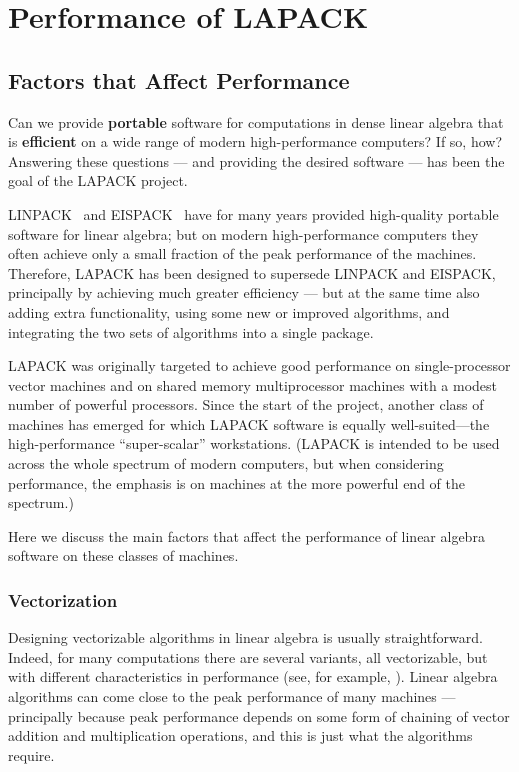 \chapter{Performance of LAPACK}\label{chapperformance}

\section{Factors that Affect Performance}\label{secperf}

Can we provide {\bf portable} software for computations
in dense linear algebra
that is {\bf efficient} on a wide range of modern high-performance
computers?
If so, how?
Answering these questions --- and providing
the desired software --- has been the goal of the LAPACK project.

LINPACK~\cite{dongarra79}
and EISPACK~\cite{Smith76,Garbow77} have for many years provided
high-quality portable software for linear algebra; but
on modern high-performance computers they often
achieve only a small fraction of the peak performance of the machines.
Therefore, LAPACK has been designed to supersede LINPACK and EISPACK,
principally by achieving much greater efficiency --- but at the same time
also adding extra functionality, using some new or improved algorithms,
and integrating the two sets of algorithms into a single package.

LAPACK was originally targeted to achieve good performance on
single-processor
vector machines and on shared memory multiprocessor
machines with a modest
number of powerful processors. Since the start of the project,
another class of machines has
emerged for which LAPACK software is equally well-suited---the
high-performance
``super-scalar'' workstations.
(LAPACK is intended to be used across the whole spectrum of modern
computers,
but when considering performance, the emphasis is on machines at the more
powerful end of the spectrum.)

Here we discuss the main factors that affect the performance of linear
algebra software on these classes of machines.

\subsection{Vectorization}\label{subsecvectorize}

Designing vectorizable algorithms in linear algebra is usually
straightforward.
Indeed, for many computations there are several variants, all vectorizable,
but
with different characteristics in performance (see, for example,
\cite{Dongarra84a}).
Linear algebra algorithms can come close to the peak performance of
many machines --- principally because peak performance depends on some form
of
chaining of vector addition and multiplication operations, and this is just
what the algorithms require.

